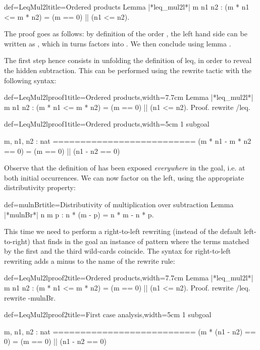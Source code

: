 \begin{coq}{def=LeqMul2l}{title=Ordered products}
Lemma |*leq_mul2l*| m n1 n2 : (m * n1 <= m * n2) = (m == 0) || (n1 <= n2).
\end{coq}

The proof goes as follows: by definition of the order \C{<=}, the left
hand side can be written as , which in turns
factors into . We then conclude using
lemma .

The first step hence consists in unfolding the definition of leq, in order to
reveal the hidden subtraction. This can be performed using the rewrite
tactic with the following syntax:

\begin{coq}{def=LeqMul2lproof1}{title=Ordered products,width=7.7cm}
Lemma |*leq_mul2l*| m n1 n2 :
(m * n1 <= m * n2) = (m == 0) || (n1 <= n2).
Proof.
rewrite /leq.
\end{coq}
\begin{coqout}{def=LeqMul2lproof1}{title=Ordered products,width=5cm}
1 subgoal

m, n1, n2 : nat
==========================
(m * n1 - m * n2 == 0) =
(m == 0) || (n1 - n2 == 0)
\end{coqout}

Observe that the definition of \C{<=} has been exposed
\emph{everywhere} in the goal, i.e. at both initial occurrences.
We can now factor  on the left, using the appropriate
distributivity property:

\begin{coq}{def=mulnBr}{title=Distributivity of multiplication over subtraction}
Lemma |*mulnBr*| n m p : n * (m - p) = n * m - n * p.
\end{coq}
This time we need to perform a right-to-left rewriting (instead of the
default left-to-right) that finds in the goal an instance of pattern
\C{(_ * _ - _ * _)} where the terms matched by the first and the third
wild-cards coincide. The syntax for right-to-left rewriting adds a
minus \C{-} to the name of the rewrite rule:

\begin{coq}{def=LeqMul2lproof2}{title=Ordered products,width=7.7cm}
Lemma |*leq_mul2l*| m n1 n2 :
(m * n1 <= m * n2) = (m == 0) || (n1 <= n2).
Proof.
rewrite /leq.
rewrite -mulnBr.
\end{coq}
\begin{coqout}{def=LeqMul2lproof2}{title=First case analysis,width=5cm}
1 subgoal

m, n1, n2 : nat
==========================
(m * (n1 - n2) == 0) =
(m == 0) || (n1 - n2 == 0)
\end{coqout}

